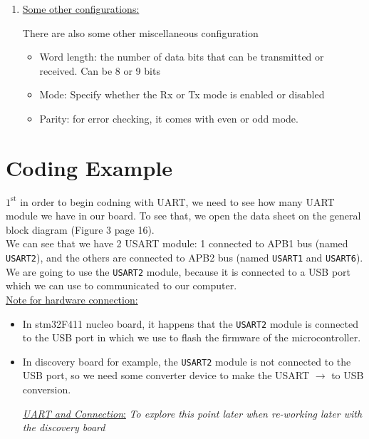 \documentclass[12pt,a4paper]{book}
\begin{document}
\begin{enumerate}
\item \underline{Some other configurations:}

There are also some other miscellaneous configuration 

    \begin{itemize}
    
    \item Word length: the number of data bits that can be transmitted or received. Can be 8 or 9 bits

    \item  Mode: Specify whether the Rx or Tx mode is enabled or disabled 
    
    \item Parity: for error checking, it comes with even or odd mode.
    
    \end{itemize}


\end{enumerate}


\newpage
\section{Coding Example}

$\mathrm{1}^\mathrm{st}$ in order to begin codning with UART, we need to see how many UART module we have in our board. To see that, we open the data sheet on the general block diagram (Figure 3 page 16).\\

We can see that we have 2 USART module: 1 connected to APB1 bus (named \verb|USART2|), and the others are connected to APB2 bus (named \verb|USART1| and  \verb|USART6|).\\

We are going to use the \verb|USART2| module, because it is connected to a USB port which we can use to communicated to our computer.\\


\underline{Note for hardware connection:}

\begin{itemize}

\item In stm32F411 nucleo board, it happens that the \verb|USART2| module is connected to the USB port in which we use to flash the firmware of the microcontroller.

\item In discovery board for example, the \verb|USART2| module is not connected to the USB port, so we need some converter device to make the USART $\rightarrow$ to USB conversion.

 \underline{\textit{UART and Connection}:} \textit{To explore this point later when re-working later with the discovery board} 


\end{itemize}
\end{document}
